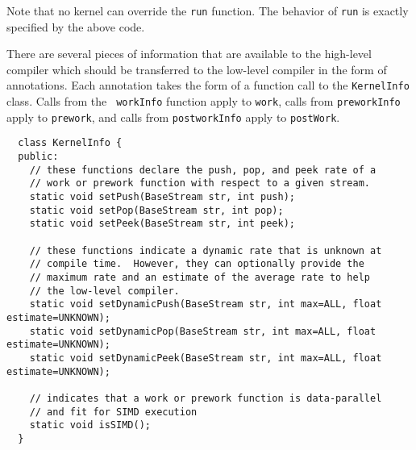 Note that no kernel can override the {\tt run} function.  The behavior
of {\tt run} is exactly specified by the above code.


There are several pieces of information that are available to the
high-level compiler which should be transferred to the low-level
compiler in the form of annotations.  Each annotation takes the form
of a function call to the {\tt KernelInfo} class.  Calls from the {\tt
workInfo} function apply to {\tt work}, calls from {\tt preworkInfo}
apply to {\tt prework}, and calls from {\tt postworkInfo} apply to
{\tt postWork}.
{\small
\begin{verbatim}
  class KernelInfo {
  public:
    // these functions declare the push, pop, and peek rate of a
    // work or prework function with respect to a given stream.
    static void setPush(BaseStream str, int push);
    static void setPop(BaseStream str, int pop);
    static void setPeek(BaseStream str, int peek);

    // these functions indicate a dynamic rate that is unknown at
    // compile time.  However, they can optionally provide the 
    // maximum rate and an estimate of the average rate to help
    // the low-level compiler.
    static void setDynamicPush(BaseStream str, int max=ALL, float estimate=UNKNOWN);
    static void setDynamicPop(BaseStream str, int max=ALL, float estimate=UNKNOWN);
    static void setDynamicPeek(BaseStream str, int max=ALL, float estimate=UNKNOWN);

    // indicates that a work or prework function is data-parallel 
    // and fit for SIMD execution
    static void isSIMD();
  }  
\end{verbatim}}

